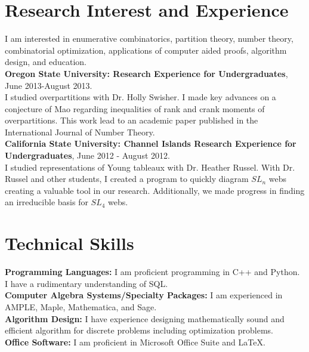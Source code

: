 \documentclass[letterpaper]{article}
\begin{document}
\section*{\textbf{Research Interest and Experience}}
I am interested in enumerative combinatorics, partition theory, number theory, combinatorial optimization, applications of computer aided proofs, algorithm design, and education.\vspace{.2cm} \\ %
 {\bf Oregon State University: Research Experience for Undergraduates}, June 2013-August 2013.\\
{\small I studied overpartitions with Dr. Holly Swisher. I made key advances on a conjecture of Mao regarding inequalities of rank and crank moments of overpartitions.  %
This work lead to an academic paper published in the International Journal of Number Theory. }\vspace{.2cm} \\
{\bf California State University: Channel Islands Research Experience for Undergraduates}, June 2012 - August 2012. 
\\ {\small  I studied representations of Young tableaux with Dr. Heather Russel. With Dr. Russel and other students, I created a program to quickly diagram $SL_n$ webs creating a valuable tool in our research. Additionally, we made progress in finding an irreducible basis for $SL_4$ webs.}\vspace{.2cm}\\
\section*{Technical Skills}
\textbf{Programming Languages:} I am proficient programming in C++ and Python. I have a rudimentary understanding of SQL. \vspace{.2cm}\\
\textbf{Computer Algebra Systems/Specialty Packages:} I am experienced in AMPLE, Maple, Mathematica, and Sage.\vspace{.2cm}\\ 
\textbf{Algorithm Design:} I have experience designing mathematically sound and efficient algorithm for discrete problems including optimization problems. \vspace{.2cm}\\ 
\textbf{Office Software:} I am proficient in Microsoft Office Suite and LaTeX.
\end{document}
